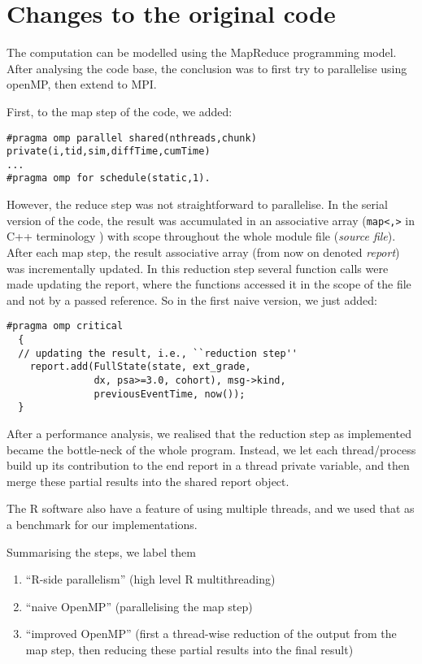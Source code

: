 
\section{Changes to the original code}
The computation can be modelled using the MapReduce programming model. After
analysing the code base, the conclusion was to first try to
parallelise using openMP, then extend to MPI.

First, to the map step of the code, we added:
\begin{lstlisting}
#pragma omp parallel shared(nthreads,chunk) private(i,tid,sim,diffTime,cumTime)
...
#pragma omp for schedule(static,1).
\end{lstlisting}
However, the reduce step was not straightforward to parallelise. In
the serial version of the code, the result was accumulated in an
associative array (\texttt{map<,>} in C++ terminology ) with scope
throughout the whole module file (\emph{source file}). After each map
step, the result associative array (from now on denoted \emph{report})
was incrementally updated. In this reduction step several function
calls were made updating the report, where the functions
accessed it in the scope of the file and not by a passed reference. So
in the first naive version, we just added:
\lstset{language=C++}
\begin{lstlisting}
#pragma omp critical
  {
  // updating the result, i.e., ``reduction step''
    report.add(FullState(state, ext_grade,
               dx, psa>=3.0, cohort), msg->kind,
               previousEventTime, now());
  }
\end{lstlisting}

After a performance analysis, we realised that the reduction step as
implemented became the bottle-neck of the whole program. Instead, we
let each thread/process build up its contribution to the end report in
a thread private variable, and then merge these partial results into the
shared report object.

The R software also have a feature of using multiple threads, and we used
that as a benchmark for our implementations.

Summarising the steps, we label them
\begin{enumerate}
\item ``R-side parallelism'' (high level R multithreading)
\item ``naive OpenMP'' (parallelising the map step)
\item ``improved OpenMP'' (first a thread-wise reduction of the output
  from the map step, then
  reducing these partial results into the final result)
\end{enumerate}


